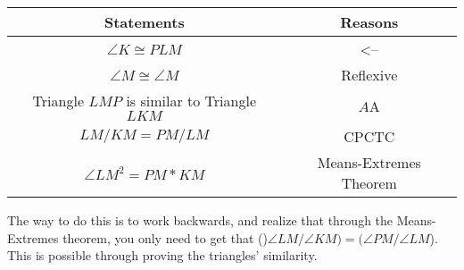 \documentclass{article}
\begin{document}
		\hskip-0.5cm\begin{tabular}{|c | c|} 
			\hline
			Statements & Reasons \\ [0.5ex] 
			\hline\hline
			$\angle K \cong PLM$  & <--  \\ 
			\hline
			$\angle M \cong \angle M$ & Reflexive \\
			\hline
			Triangle $LMP$ is similar to Triangle $LKM$ & $A$A \\
			\hline
			$LM/KM = PM/LM$ & CPCTC \\
			\hline
			$\angle LM ^ 2 = PM * KM$ & Means-Extremes Theorem \\[1ex] 
			\hline	
			\end{tabular}
		
		The way to do this is to work backwards, and realize that through the Means-Extremes theorem, you only need to get that ()$\angle LM/ \angle KM) = (\angle PM/\angle LM$). This is possible through proving the triangles' similarity.
\end{document}
